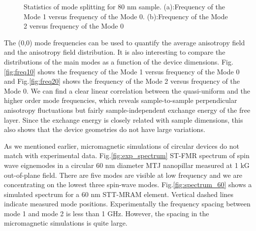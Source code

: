 \begin{figure}[h!]
\centering     
{}
\caption{Statistics of mode splitting for 80 nm sample. (a):Frequency of the Mode 1 versus frequency of the Mode 0. (b):Frequency of the Mode 2 versus frequency of the Mode 0}
\end{figure}



The (0,0) mode frequencies can be used to quantify the average anisotropy field and the anisotropy field distribution. It is also interesting to compare the distributions of the main modes as a function of the device dimensions. Fig.\ref{fig:freq10} shows the frequency of the Mode 1 versus frequency of the Mode 0 and Fig.\ref{fig:freq20} shows the frequency of the Mode 2 versus frequency of the Mode 0. We can find a clear linear correlation between the quasi-uniform and the higher order mode frequencies, which reveals sample-to-sample perpendicular anisotropy fluctuations but fairly sample-independent exchange energy of the free layer. Since the exchange energy is closely related with sample dimensions, this also shows that the device geometries do not have large variations.


As we mentioned earlier, micromagnetic simulations of circular devices do not match with experimental data. Fig.\ref{fig:exp_spectrum} ST-FMR spectrum of spin wave eignemodes in a circular 60 nm diameter MTJ nanopillar measured at 1 kG out-of-plane field. There are five modes are visible at low frequency and we are concentrating on the lowest three spin-wave modes. Fig.\ref{fig:spectrum_60} shows a simulated spectrum for a 60 nm STT-MRAM element. Vertical dashed lines indicate measured mode positions. Experimentally the frequency spacing between mode 1 and mode 2 is less than 1 GHz. However, the spacing in the micromagnetic simulations is quite large.


